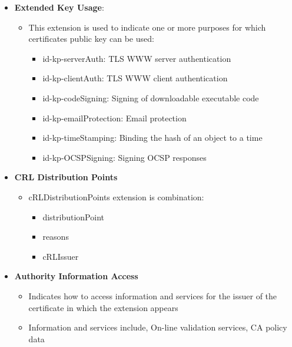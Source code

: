 \documentclass[12pt]{report}
\begin{document}
\begin{itemize}
\begin{itemize}
                \end{itemize}
            \item \textbf{Extended Key Usage}:
                \begin{itemize}
                    \item This extension is used to indicate one or more purposes for which certificates public key can be used:
                        \begin{itemize}
                            \item id-kp-serverAuth: TLS WWW server authentication
                            \item id-kp-clientAuth: TLS WWW client authentication
                            \item id-kp-codeSigning: Signing of downloadable executable code
                            \item id-kp-emailProtection: Email protection
                            \item id-kp-timeStamping: Binding the hash of an object to a time
                            \item id-kp-OCSPSigning: Signing OCSP responses
                        \end{itemize}
                \end{itemize}
            \item \textbf{CRL Distribution Points}
                \begin{itemize}
                    \item cRLDistributionPoints extension is combination:
                        \begin{itemize}
                            \item distributionPoint
                            \item reasons
                            \item cRLIssuer
                        \end{itemize}
                \end{itemize}
            \item \textbf{Authority Information Access}
                \begin{itemize}
                    \item Indicates how to access information and services for the issuer of the certificate in which the extension appears
                    \item Information and services include, On-line validation services, CA policy data

\end{itemize}
\end{itemize}
\end{document}

